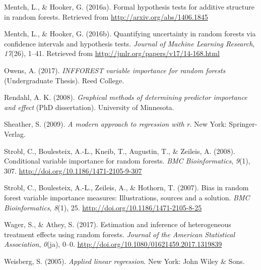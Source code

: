 \documentclass[12pt,twoside]{reedthesis}
\theoremstyle{definition}
\theoremstyle{definition}
\theoremstyle{definition}
\theoremstyle{remark}
\begin{document}
\hypertarget{ref-mentch2016b}{}
Mentch, L., \& Hooker, G. (2016a). Formal hypothesis tests for additive
structure in random forests. Retrieved from
\url{http://arxiv.org/abs/1406.1845}

\hypertarget{ref-mentch2016a}{}
Mentch, L., \& Hooker, G. (2016b). Quantifying uncertainty in random
forests via confidence intervals and hypothesis tests. \emph{Journal of
Machine Learning Research}, \emph{17}(26), 1--41. Retrieved from
\url{http://jmlr.org/papers/v17/14-168.html}

\hypertarget{ref-owens2017}{}
Owens, A. (2017). \emph{INFFOREST variable importance for random
forests} (Undergraduate Thesis). Reed College.

\hypertarget{ref-rendahl2008}{}
Rendahl, A. K. (2008). \emph{Graphical methods of determining predictor
importance and effect} (PhD dissertation). University of Minnesota.

\hypertarget{ref-sheather2009}{}
Sheather, S. (2009). \emph{A modern approach to regression with r}. New
York: Springer-Verlag.

\hypertarget{ref-strobl2008}{}
Strobl, C., Boulesteix, A.-L., Kneib, T., Augustin, T., \& Zeileis, A.
(2008). Conditional variable importance for random forests. \emph{BMC
Bioinformatics}, \emph{9}(1), 307.
\url{http://doi.org/10.1186/1471-2105-9-307}

\hypertarget{ref-strobl2007}{}
Strobl, C., Boulesteix, A.-L., Zeileis, A., \& Hothorn, T. (2007). Bias
in random forest variable importance measures: Illustrations, sources
and a solution. \emph{BMC Bioinformatics}, \emph{8}(1), 25.
\url{http://doi.org/10.1186/1471-2105-8-25}

\hypertarget{ref-wager2017}{}
Wager, S., \& Athey, S. (2017). Estimation and inference of
heterogeneous treatment effects using random forests. \emph{Journal of
the American Statistical Association}, \emph{0}(ja), 0--0.
\url{http://doi.org/10.1080/01621459.2017.1319839}

\hypertarget{ref-weisberg2005}{}
Weisberg, S. (2005). \emph{Applied linear regression}. New York: John
Wiley \& Sons.


\end{document}
